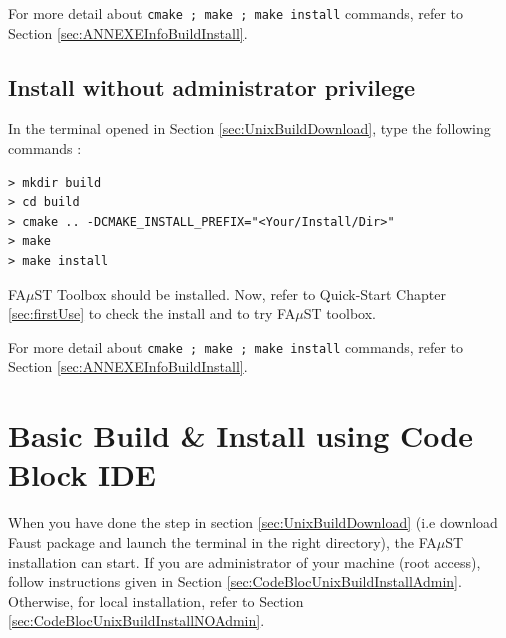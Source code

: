 For more detail about \texttt{cmake ; make ; make install} commands, refer to Section \ref{sec:ANNEXEInfoBuildInstall}.


\subsection{Install without administrator privilege}\label{sec:UnixBuildInstallNOAdmin}
In the terminal opened in Section \ref{sec:UnixBuildDownload}, type the following commands :
\lstset{style=customBash}
\begin{lstlisting}
> mkdir build
> cd build
> cmake .. -DCMAKE_INSTALL_PREFIX="<Your/Install/Dir>"
> make
> make install
\end{lstlisting}

FA$\mu$ST Toolbox should be installed. Now, refer to Quick-Start Chapter \ref{sec:firstUse} to check the install and to try FA$\mu$ST toolbox.

For more detail about \texttt{cmake ; make ; make install} commands, refer to Section \ref{sec:ANNEXEInfoBuildInstall}.


\section{Basic Build \& Install using Code Block IDE}\label{sec:UnixInstallCodeBlock}
When you have done the step in section  \ref{sec:UnixBuildDownload} (i.e download Faust package and launch the terminal in the right directory),  the FA$\mu$ST installation can start. If you are administrator of your machine (root access), follow instructions given in Section \ref{sec:CodeBlocUnixBuildInstallAdmin}. Otherwise, for local installation, refer to Section \ref{sec:CodeBlocUnixBuildInstallNOAdmin}. 

